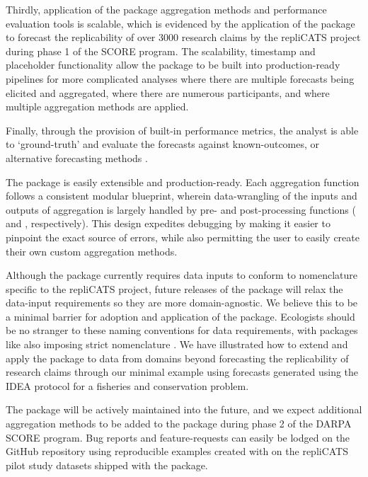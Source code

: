 \documentclass[article]{jss}
\newcommand{\fct}[1]{\code{#1()}}
\begin{document}
Thirdly, application of the  package aggregation methods
and performance evaluation tools is scalable, which is evidenced by the
application of the  package to forecast the replicability
of over 3000 research claims by the repliCATS project during phase 1 of
the SCORE program. The scalability, timestamp and placeholder
functionality allow the  package to be built into
production-ready pipelines for more complicated analyses where there are
multiple forecasts being elicited and aggregated, where there are
numerous participants, and where multiple aggregation methods are
applied.

Finally, through the provision of built-in performance metrics, the
analyst is able to `ground-truth' and evaluate the forecasts against
known-outcomes, or alternative forecasting methods
\citep[e.g.][]{Arlidge2020}.

The  package is easily extensible and production-ready.
Each aggregation function follows a consistent modular blueprint,
wherein data-wrangling of the inputs and outputs of aggregation is
largely handled by pre- and post-processing functions
(\fct{preprocess\_judgements} and \fct{postprocess\_judgements},
respectively). This design expedites debugging by making it easier to
pinpoint the exact source of errors, while also permitting the user to
easily create their own custom aggregation methods.

Although the package currently requires data inputs to conform to
nomenclature specific to the repliCATS project, future releases of the
 package will relax the data-input requirements so they
are more domain-agnostic. We believe this to be a minimal barrier for
adoption and application of the  package. Ecologists
should be no stranger to these naming conventions for data requirements,
with packages like  also imposing strict nomenclature
\citep{veganpkg2020}. We have illustrated how to extend and apply the
package to data from domains beyond forecasting the replicability of
research claims through our minimal example using forecasts generated
using the IDEA protocol for a fisheries and conservation problem.

The package will be actively maintained into the future, and we expect
additional aggregation methods to be added to the package during phase 2
of the DARPA SCORE program. Bug reports and feature-requests can easily
be lodged on the  GitHub repository using reproducible
examples created with  \citep{reprexpkg2020} on the
repliCATS pilot study datasets shipped with the  package.
\end{document}
